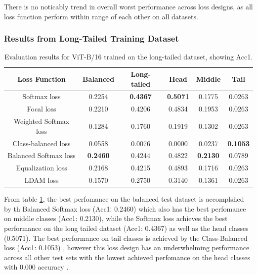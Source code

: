 There is no noticably trend in overall worst performance across loss designs, as all loss function perform within range of each other on all datasets.


\subsubsection{Results from Long-Tailed Training Dataset}

\begin{table}[h!]
    \centering
    \caption{Evaluation results for ViT-B/16 trained on the long-tailed dataset, showing Acc1.}
    \begin{tabular}{cccccc}
        \toprule
        Loss Function & Balanced & Long-tailed & Head & Middle & Tail \\ 
        \midrule
        Softmax loss   & 0.2254 & \textbf{0.4367} & \textbf{0.5071} & 0.1775 & 0.0263 \\
        Focal loss   & 0.2210 & 0.4206 & 0.4834 & 0.1953 & 0.0263 \\
        Weighted Softmax loss   & 0.1284 & 0.1760 & 0.1919 & 0.1302 & 0.0263 \\
        Class-balanced loss   & 0.0558 & 0.0076 & 0.0000 & 0.0237 & \textbf{0.1053} \\
        Balanced Softmax loss   & \textbf{0.2460} & 0.4244 & 0.4822 &  \textbf{0.2130} & 0.0789 \\
        Equalization loss   & 0.2168 & 0.4215 & 0.4893 & 0.1716 & 0.0263 \\
        LDAM loss   & 0.1570 & 0.2750 & 0.3140 & 0.1361 & 0.0263 \\
        \bottomrule
    \end{tabular}
    \label{tab:vit_lt_acc1}
\end{table}

From table \ref{tab:vit_lt_acc1}, the best perfomance on the balanced test dataset is accomplshed by th Balanced Softmax loss (Acc1: 0.2460) which also has the best perfomance on middle classes (Acc1: 0.2130), while the Softmax loss achieves the best performance on the long tailed dataset (Acc1: 0.4367) as well as the head classes (0.5071). The best performance on tail classes is achieved by the Class-Balanced loss (Acc1: 0.1053) , however this loss design has an underwhelming performance across all other test sets with the lowest achieved perfomance on the head classes with 0.000 accuracy . 

